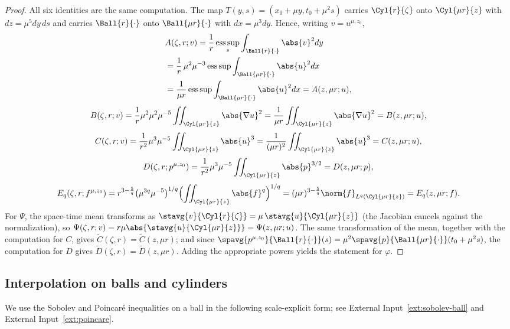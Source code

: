 \documentclass[11pt,reqno]{amsart}
\begin{document}
\begin{proof}
All six identities are the same computation. The map
$T(y,s)=(x_{0}+\mu y,t_{0}+\mu^{2}s)$ carries $\Cyl{r}{\zeta}$ onto $\Cyl{\mu r}{z}$
with $dz=\mu^{5}dy\,ds$ and carries $\Ball{r}{\cdot}$ onto $\Ball{\mu r}{\cdot}$
with $dx=\mu^{3}dy$. Hence, writing $v=u^{\mu,z_{0}}$,
\[\begin{aligned}
  &A(\zeta,r;v)=\frac1r\operatorname*{ess\,sup}_{s}\int_{\Ball{r}{\cdot}}\abs{v}^{2}dy
  \\ &=\frac1r\,\mu^{2}\mu^{-3}\operatorname*{ess\,sup}\int_{\Ball{\mu r}{\cdot}}\abs{u}^{2}dx
  \\ &=\frac{1}{\mu r}\operatorname*{ess\,sup}\int_{\Ball{\mu r}{\cdot}}\abs{u}^{2}dx
  =A(z,\mu r;u),
\end{aligned}\]
\[
  B(\zeta,r;v)=\frac1r\mu^{2}\mu^{2}\mu^{-5}\iint_{\Cyl{\mu r}{z}}\abs{\nabla u}^{2}
   =\frac{1}{\mu r}\iint_{\Cyl{\mu r}{z}}\abs{\nabla u}^{2}=B(z,\mu r;u),
\]
\[
  C(\zeta,r;v)=\frac1{r^{2}}\mu^{3}\mu^{-5}\iint_{\Cyl{\mu r}{z}}\abs{u}^{3}
   =\frac{1}{(\mu r)^{2}}\iint_{\Cyl{\mu r}{z}}\abs{u}^{3}=C(z,\mu r;u),
\]
\[
  D(\zeta,r;p^{\mu,z_{0}})=\frac1{r^{2}}\mu^{3}\mu^{-5}\iint_{\Cyl{\mu r}{z}}\abs{p}^{3/2}
   =D(z,\mu r;p),
\]
\[
  E_{q}(\zeta,r;f^{\mu,z_{0}})
   =r^{3-\frac5q}\bigl(\mu^{3q}\mu^{-5}\bigr)^{1/q}\Bigl(\iint_{\Cyl{\mu r}{z}}\abs{f}^{q}\Bigr)^{1/q}
   =(\mu r)^{3-\frac5q}\norm{f}_{L^{q}(\Cyl{\mu r}{z})}=E_{q}(z,\mu r;f).
\]
For $\Psi$, the space-time mean transforms as
$\stavg{v}{\Cyl{r}{\zeta}}=\mu\,\stavg{u}{\Cyl{\mu r}{z}}$ (the Jacobian cancels
against the normalization), so
$\Psi(\zeta,r;v)=r\mu\abs{\stavg{u}{\Cyl{\mu r}{z}}}=\Psi(z,\mu r;u)$. The same
transformation of the mean, together with the computation for $C$, gives
$\widetilde C(\zeta,r)=\widetilde C(z,\mu r)$; and since
$\spavg{p^{\mu,z_{0}}}{\Ball{r}{\cdot}}(s)=\mu^{2}\spavg{p}{\Ball{\mu r}{\cdot}}(t_{0}+\mu^{2}s)$,
the computation for $D$ gives $\widetilde D(\zeta,r)=\widetilde D(z,\mu r)$.
Adding the appropriate powers yields the statement for $\varphi$.
\end{proof}

\subsection{Interpolation on balls and cylinders}\label{ss:interpolation}

We use the Sobolev and Poincar\'e inequalities on a ball in the following
scale-explicit form; see External Input~\ref{ext:sobolev-ball} and
External Input~\ref{ext:poincare}.
\end{document}
